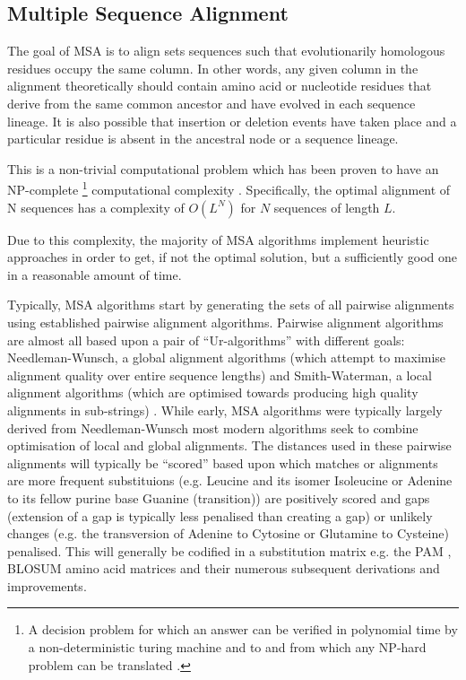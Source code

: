 \subsection{Multiple Sequence Alignment}

The goal of MSA is to align sets sequences such that 
evolutionarily homologous residues occupy the same column. In other words,
any given column in the alignment theoretically should contain amino acid or nucleotide residues
that derive from the same common ancestor and have evolved in each sequence lineage.
It is also possible that insertion or deletion events have taken place
and a particular residue is absent in the ancestral node or a sequence lineage.

This is a non-trivial computational problem which has been proven to have an NP-complete
\footnote{A decision problem for which an answer can be verified in polynomial time 
    by a non-deterministic turing machine and to and from which any NP-hard problem
    can be translated \citep{Karp1972}.} computational complexity \citep{Wang1994}.
Specifically, the optimal alignment of N sequences has a complexity of \( O(L^{N}) \)
for \( N\) sequences of length \( L \)\citep{Sievers2011}.

Due to this complexity, the majority of MSA algorithms implement heuristic approaches
in order to get, if not the optimal solution, but a sufficiently good one in a reasonable
amount of time. 

Typically, MSA algorithms start by generating the sets of all pairwise alignments
using established pairwise alignment algorithms.
Pairwise alignment algorithms are almost all based upon a
pair of ``Ur-algorithms'' with different goals: 
Needleman-Wunsch, a global alignment algorithms (which attempt to maximise 
alignment quality over entire sequence lengths) \citep{Needleman1970} and Smith-Waterman, 
a local alignment algorithms (which are optimised towards producing high quality alignments
in sub-strings) \citep{Smith1981}.  While early, MSA algorithms were typically
largely derived from Needleman-Wunsch most modern algorithms seek to combine 
optimisation of local and global alignments.  The distances used in these
pairwise alignments will typically be ``scored'' based upon which matches or 
alignments are more frequent substituions (e.g. Leucine and its isomer Isoleucine 
or Adenine to its fellow purine base Guanine (transition)) 
are positively scored and gaps (extension of a gap is typically
less penalised than creating a gap) or unlikely changes (e.g. the transversion
of Adenine to Cytosine or Glutamine to Cysteine) penalised.
This will generally be codified in a substitution matrix e.g. the PAM \citep{Dayhoff1978}, 
BLOSUM \citep{Henikoff1992} amino acid matrices and their numerous subsequent
derivations and improvements. 


